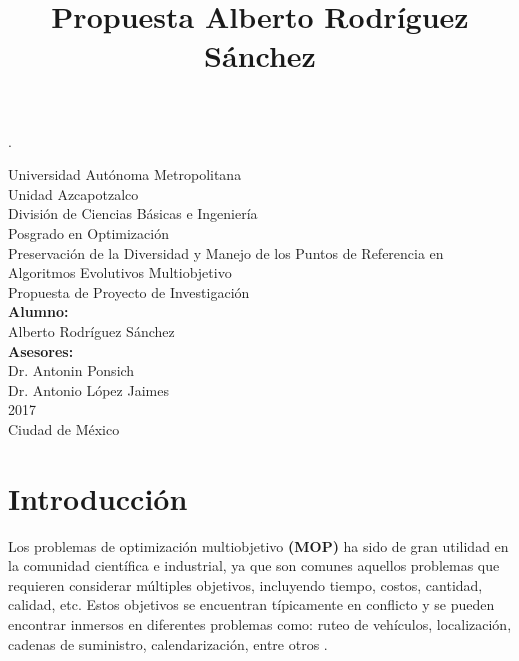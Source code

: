 \documentclass[letterpaper,10pt]{article}
\title{Propuesta Alberto Rodríguez Sánchez}
\begin{document}
\renewcommand{\refname}{Bibliografía}.
\thispagestyle{empty}

\begin{center}
    {\Huge Universidad Autónoma Metropolitana }\\
    {\huge Unidad Azcapotzalco}\\
    \vspace{0.5cm}
    {\Large División de Ciencias Básicas e Ingeniería}\\
    \vspace{1.0cm}
    {\large Posgrado en Optimización}\\
    \vspace{2.0cm}    
    {\Large Preservación de la Diversidad y Manejo de los Puntos de Referencia en Algoritmos Evolutivos Multiobjetivo}\\
    \vspace{1.0cm}
    {\large Propuesta de Proyecto de Investigación}\\
    \vspace{2.0cm}
    {\large\textbf{Alumno:}}\\
    Alberto Rodríguez Sánchez\\
    \vspace{1.5cm}
    \bigskip
    {\large\textbf{Asesores:}}\\
    Dr. Antonin Ponsich\\
    Dr. Antonio López Jaimes\\
    \vspace{1.5cm}
     2017\\
    \vspace{1.0cm}
    Ciudad de México\\
\end{center}
\newpage
\tableofcontents
\newpage
\section{Introducción}

Los problemas de optimización multiobjetivo \textbf{(MOP)} ha sido de gran utilidad en la comunidad científica e industrial, ya que son comunes aquellos problemas que requieren
considerar múltiples objetivos, incluyendo tiempo, costos, cantidad, calidad, etc. Estos objetivos se encuentran típicamente en conflicto y se pueden encontrar inmersos en
diferentes problemas como: ruteo de vehículos, localización, cadenas de suministro, calendarización, entre otros \cite{coello2004applications}.\\
\end{document}
